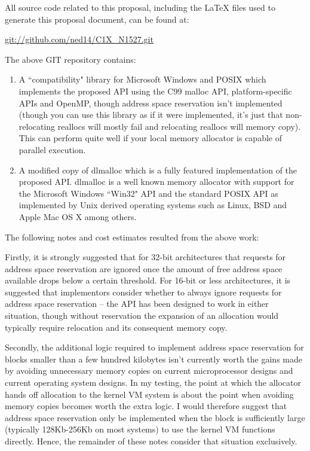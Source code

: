 \documentclass[wd]{isov2}
\begin{document}
{
All source code related to this proposal, including the LaTeX files used to generate this proposal document, can be found at:
\begin{center}
\url{git://github.com/ned14/C1X_N1527.git}
\end{center}
The above GIT repository contains:
\begin{enumerate}
\item A ``compatibility" library for Microsoft Windows and POSIX which implements the proposed API using the C99 malloc API, platform-specific APIs and OpenMP, though address space reservation isn't implemented (though you can use this library as if it were implemented, it's just that non-relocating reallocs will mostly fail and relocating reallocs will memory copy). This can perform quite well if your local memory allocator is capable of parallel execution.
\item A modified copy of dlmalloc  which is a fully featured implementation of the proposed API. dlmalloc is a well known memory allocator with support for the Microsoft Windows ``Win32" API and the standard POSIX API as implemented by Unix derived operating systems such as Linux, BSD and Apple Mac OS X among others.
\end{enumerate}
The following notes and cost estimates resulted from the above work:

Firstly, it is strongly suggested that for 32-bit architectures that requests for address space reservation are ignored once the amount of free address space available drops below a certain threshold. For 16-bit or less architectures, it is suggested that implementors consider whether to always ignore requests for address space reservation -- the API has been designed to work in either situation, though without reservation the expansion of an allocation would typically require relocation and its consequent memory copy.

Secondly, the additional logic required to implement address space reservation for blocks smaller than a few hundred kilobytes isn't currently worth the gains made by avoiding unnecessary memory copies on current microprocessor designs and current operating system designs. In my testing, the point at which the allocator hands off allocation to the kernel VM system is about the point when avoiding memory copies becomes worth the extra logic. I would therefore suggest that address space reservation only be implemented when the block is sufficiently large (typically 128Kb-256Kb on most systems) to use the kernel VM functions directly. Hence, the remainder of these notes consider that situation exclusively.

}
\end{document}
